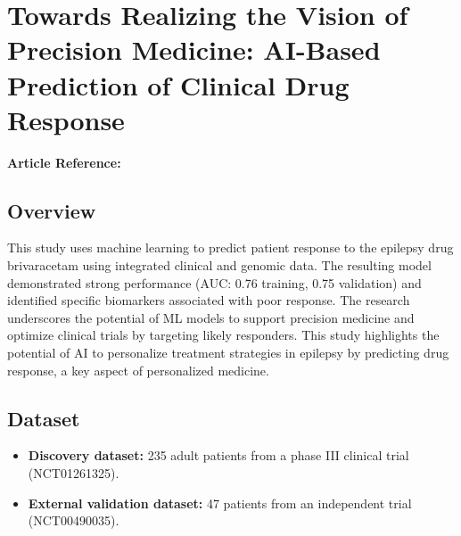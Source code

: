 \section{Towards Realizing the Vision of Precision Medicine: AI-Based Prediction of Clinical Drug Response}
\textbf{Article Reference:} \cite{article_1}

\subsection*{Overview}
This study uses machine learning to predict patient response to the epilepsy drug brivaracetam using integrated clinical and genomic data. The resulting model demonstrated strong performance (AUC: 0.76 training, 0.75 validation) and identified specific biomarkers associated with poor response. The research underscores the potential of ML models to support precision medicine and optimize clinical trials by targeting likely responders. This study highlights the potential of AI to personalize treatment strategies in epilepsy by predicting drug response, a key aspect of personalized medicine.

\subsection*{Dataset}
\begin{itemize}
    \item \textbf{Discovery dataset:} 235 adult patients from a phase III clinical trial (NCT01261325).
    \item \textbf{External validation dataset:} 47 patients from an independent trial (NCT00490035).
\end{itemize}

